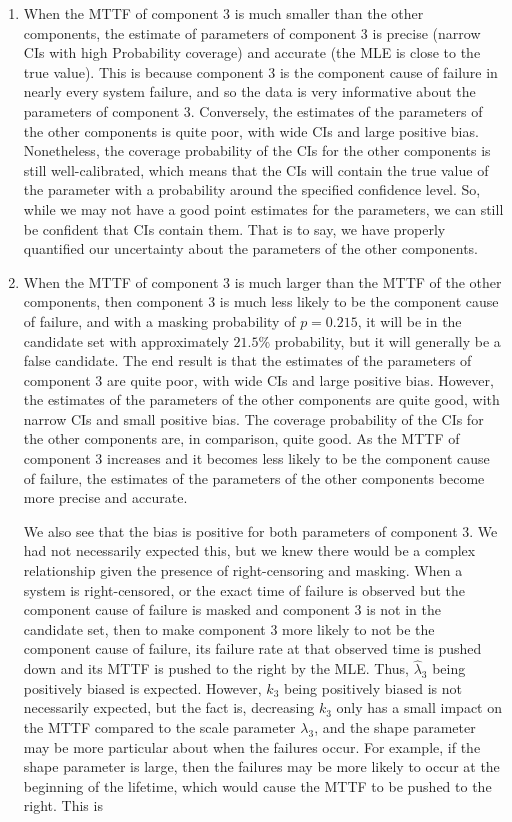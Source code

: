 \documentclass[
]{article}
\begin{document}
\begin{enumerate}
\def\labelenumi{\arabic{enumi}.}
\item
  When the MTTF of component 3 is much smaller than the other
  components, the estimate of parameters of component 3 is precise
  (narrow CIs with high Probability coverage) and accurate (the MLE is
  close to the true value). This is because component 3 is the component
  cause of failure in nearly every system failure, and so the data is
  very informative about the parameters of component 3. Conversely, the
  estimates of the parameters of the other components is quite poor,
  with wide CIs and large positive bias. Nonetheless, the coverage
  probability of the CIs for the other components is still
  well-calibrated, which means that the CIs will contain the true value
  of the parameter with a probability around the specified confidence
  level. So, while we may not have a good point estimates for the
  parameters, we can still be confident that CIs contain them. That is
  to say, we have properly quantified our uncertainty about the
  parameters of the other components.
\item
  When the MTTF of component 3 is much larger than the MTTF of the other
  components, then component 3 is much less likely to be the component
  cause of failure, and with a masking probability of \(p = 0.215\), it
  will be in the candidate set with approximately \(21.5\%\)
  probability, but it will generally be a false candidate. The end
  result is that the estimates of the parameters of component 3 are
  quite poor, with wide CIs and large positive bias. However, the
  estimates of the parameters of the other components are quite good,
  with narrow CIs and small positive bias. The coverage probability of
  the CIs for the other components are, in comparison, quite good. As
  the MTTF of component 3 increases and it becomes less likely to be the
  component cause of failure, the estimates of the parameters of the
  other components become more precise and accurate.

  We also see that the bias is positive for both parameters of component
  3. We had not necessarily expected this, but we knew there would be a
  complex relationship given the presence of right-censoring and
  masking. When a system is right-censored, or the exact time of failure
  is observed but the component cause of failure is masked and component
  3 is not in the candidate set, then to make component 3 more likely to
  not be the component cause of failure, its failure rate at that
  observed time is pushed down and its MTTF is pushed to the right by
  the MLE. Thus, \(\hat\lambda_3\) being positively biased is expected.
  However, \(k_3\) being positively biased is not necessarily expected,
  but the fact is, decreasing \(k_3\) only has a small impact on the
  MTTF compared to the scale parameter \(\lambda_3\), and the shape
  parameter may be more particular about when the failures occur. For
  example, if the shape parameter is large, then the failures may be
  more likely to occur at the beginning of the lifetime, which would
  cause the MTTF to be pushed to the right. This is


\end{enumerate}
\end{document}

